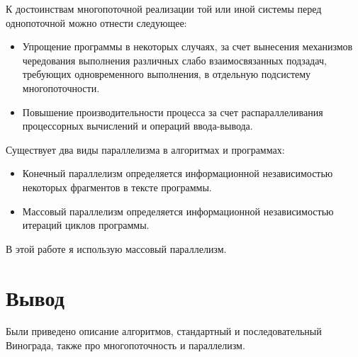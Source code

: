 К достоинствам многопоточной реализации той или иной системы перед однопоточной можно отнести следующее:

\begin{itemize}
    \item Упрощение программы в некоторых случаях, за счет вынесения механизмов чередования выполнения различных слабо взаимосвязанных подзадач, требующих одновременного выполнения, в отдельную подсистему многопоточности.
    \item Повышение производительности процесса за счет распараллеливания процессорных вычислений и операций ввода-вывода.
\end{itemize}


Существует два виды параллелизма в алгоритмах и программах:

\begin{itemize}
    \item Конечный параллелизм определяется информационной
    независимостью некоторых фрагментов в тексте программы.
    \item Массовый параллелизм определяется
    информационной независимостью итераций циклов программы.
\end{itemize}

В этой работе я использую массовый параллелизм.

\section{Вывод}
Были приведено описание алгоритмов, стандартный и последовательный Винограда,
также про многопоточность и параллелизм.
